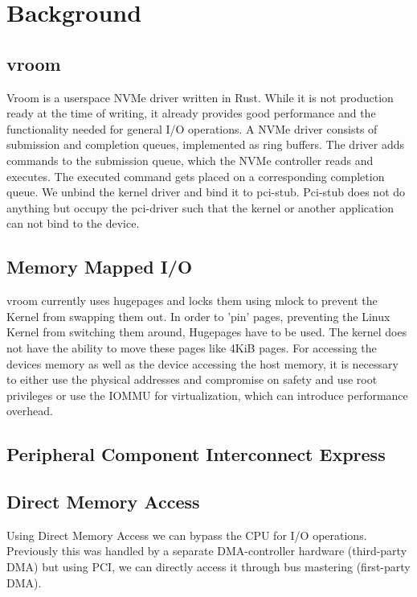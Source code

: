 \chapter{Background}

\section{vroom}
Vroom is a userspace NVMe driver written in Rust. While it is not production ready at the time of writing, it already provides good performance and the functionality needed for general I/O operations.
A NVMe driver consists of submission and completion queues, implemented as ring buffers. The driver adds commands to the submission queue, which the NVMe controller reads and executes. The executed command gets placed on a corresponding completion queue.
We unbind the kernel driver and bind it to pci-stub. Pci-stub does not do anything but occupy the pci-driver such that the kernel or another application can not bind to the device.

\section{Memory Mapped I/O}
vroom currently uses hugepages and locks them using mlock to prevent the Kernel from swapping them out. In order to 'pin' pages, preventing the Linux Kernel from switching them around, Hugepages have to be used. The kernel does not have the ability to move these pages like 4KiB pages.
For accessing the devices memory as well as the device accessing the host memory, it is necessary to either use the physical addresses and compromise on safety and use root privileges or use the IOMMU for virtualization, which can introduce performance overhead.


\section{Peripheral Component Interconnect Express}

\section{Direct Memory Access}
Using Direct Memory Access we can bypass the CPU for I/O operations. Previously this was handled by a separate DMA-controller hardware (third-party DMA) but using PCI, we can directly access it through bus mastering (first-party DMA).

